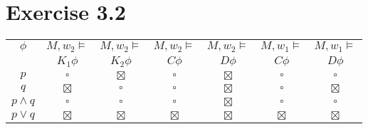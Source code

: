 \documentclass[a4paper]{article}
\begin{document}
\section{Exercise 3.2}
\begin{tabular}{c | c c c c c c}
$\phi$ & $M, w_2 \models$ & $M, w_2 \models$ & $M, w_2 \models$ & $M, w_2 \models$ &
    $M, w_1 \models$ & $M, w_1 \models$\\ 
& $K_1 \phi$ & $K_2 \phi$ & $C \phi$ & $D \phi$ & $C \phi$ & $D \phi$ \\ \hline
$p$ &$\square$&$\boxtimes$&$\square$&$\boxtimes$&$\square$&$\square$\\
$q$ &$\boxtimes$&$\square$&$\square$&$\boxtimes$&$\square$&$\boxtimes$\\
$p \land q$ &$\square$&$\square$&$\square$&$\boxtimes$&$\square$&$\square$\\
$p \lor q$ &$\boxtimes$&$\boxtimes$&$\boxtimes$&$\boxtimes$&$\boxtimes$&$\boxtimes$
\end{tabular}\\
\end{document}

